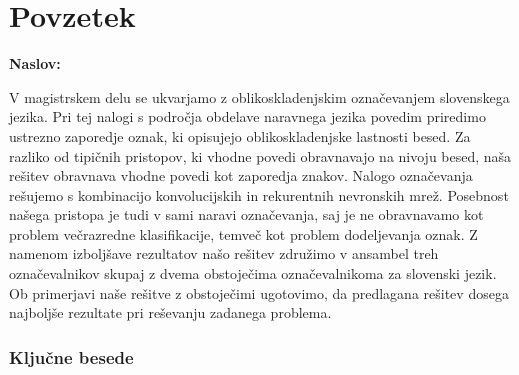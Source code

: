 \chapter*{Povzetek}

\noindent\textbf{Naslov:} \ttitle
\bigskip

V magistrskem delu se ukvarjamo z oblikoskladenjskim označevanjem slovenskega jezika. Pri tej nalogi s področja obdelave naravnega jezika povedim priredimo ustrezno zaporedje oznak, ki opisujejo oblikoskladenjske lastnosti besed. Za razliko od tipičnih pristopov, ki vhodne povedi obravnavajo na nivoju besed, naša rešitev obravnava vhodne povedi kot zaporedja znakov. Nalogo označevanja rešujemo s kombinacijo konvolucijskih in rekurentnih nevronskih mrež. Posebnost našega pristopa je tudi v sami naravi označevanja, saj je ne obravnavamo kot problem večrazredne klasifikacije, temveč kot problem dodeljevanja oznak. Z namenom izboljšave rezultatov našo rešitev združimo v ansambel treh označevalnikov skupaj z dvema obstoječima označevalnikoma za slovenski jezik. Ob primerjavi naše rešitve z obstoječimi ugotovimo, da predlagana rešitev dosega najboljše rezultate pri reševanju zadanega problema.

\subsection*{Ključne besede}
\textit{\tkeywords}
\clearemptydoublepage
